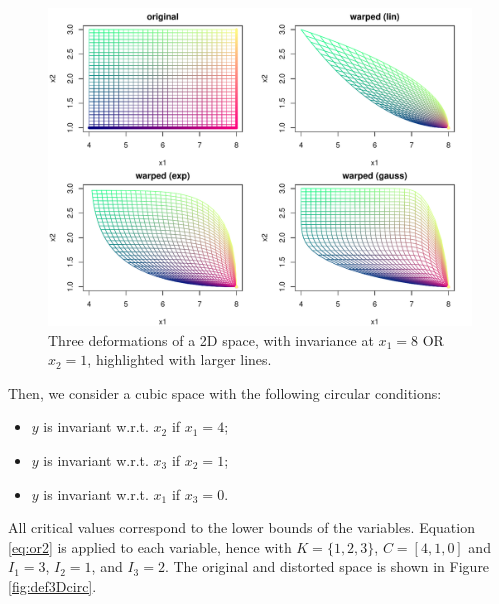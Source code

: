 	\begin{figure}[!ht]
		\centering
		\includegraphics[width=.8\textwidth]{def2DOR.pdf}
		\caption{Three deformations of a 2D space, with invariance at $x_1=8$ OR $x_2=1$, highlighted with larger lines.}\label{fig:def2DOR}
	\end{figure}
	
	Then, we consider a cubic space with the following circular conditions:
	\begin{itemize}
		\item $y$ is invariant w.r.t. $x_2$ if $x_1=4$;
		\item $y$ is invariant w.r.t. $x_3$ if $x_2=1$;
		\item $y$ is invariant w.r.t. $x_1$ if $x_3=0$.
	\end{itemize}
	All critical values correspond to the lower bounds of the variables.
	Equation \ref{eq:or2} is applied to each variable, hence with $K=\{1,2,3\}$, $C=[4,1,0]$ and $I_1=3$, $I_2=1$, and $I_3=2$. 
	The original and distorted space is shown in Figure \ref{fig:def3Dcirc}.
	
